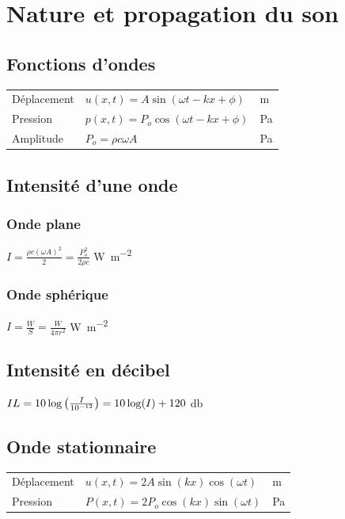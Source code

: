 \section{Nature et propagation du son}
\subsection{Fonctions d'ondes}
\begin{tabular}{lll}
    Déplacement &  \(u(x,t)=A\sin (\omega t - kx+\phi)\) & \si{\meter}\\[8pt]
    Pression & \(p(x,t)=P_{o}\cos(\omega t - kx+\phi)\) & \si{\pascal}\\[8pt]
    Amplitude & \(P_{o}=\rho c \omega A\) & \si{\pascal}
\end{tabular}
\subsection{Intensité d'une onde}
\subsubsection{Onde plane}
\begin{center}
    \(I=\frac{\rho c (\omega A)^2}{2}=\frac{P_{o}^{2}}{2\rho c}\) \si{\watt\per\meter\squared}    
\end{center}

\subsubsection{Onde sphérique}
\begin{center}
    \(I=\frac{W}{S}=\frac{W}{4\pi r^{2}}\) \si{\watt\per\meter\squared}    
\end{center}

\subsection{Intensité en décibel}
\begin{center}
    \(IL=10\log\qty(\frac{I}{10^{-12}})=10\log(I)+120\) \si{\decibel}    
\end{center}

\subsection{Onde stationnaire}
\begin{tabular}{lll}
Déplacement & \(u(x,t)=2A\sin(kx)\cos(\omega t)\) & \si{\meter}\\
Pression & \(P(x,t)=2P_{o}\cos(kx)\sin(\omega t)\) & \si{\pascal}
\end{tabular}

